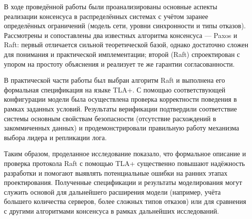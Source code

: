 \conclusion

В ходе проведённой работы были проанализированы основные аспекты реализации консенсуса в распределённых системах с учётом заранее определённых ограничений (модель сети, уровни синхронности и типы отказов). Рассмотрены и сопоставлены два известных алгоритма консенсуса — Paxos и Raft: первый отличается сильной теоретической базой, однако достаточно сложен для понимания и практической имплементации; второй (Raft) спроектирован с упором на простоту объяснения и реализует те же гарантии согласованности.

В практической части работы был выбран алгоритм Raft и выполнена его формальная спецификация на языке TLA+. С помощью соответствующей конфигурации модели была осуществлена проверка корректности поведения в рамках заданных условий. Результаты верификации подтвердили соответствие системы основным свойствам безопасности (отсутствие расхождений в закоммиченных данных) и продемонстрировали правильную работу механизма выбора лидера и репликации лога.

Таким образом, проделанное исследование показало, что формальное описание и проверка протокола Raft с помощью TLA+ существенно повышают надёжность разработки и помогают выявлять потенциальные ошибки на ранних этапах проектирования. Полученные спецификации и результаты моделирования могут служить основой для дальнейшего расширения модели (например, учёта большего количества серверов, более сложных типов отказов) или для сравнения с другими алгоритмами консенсуса в рамках дальнейших исследований.
